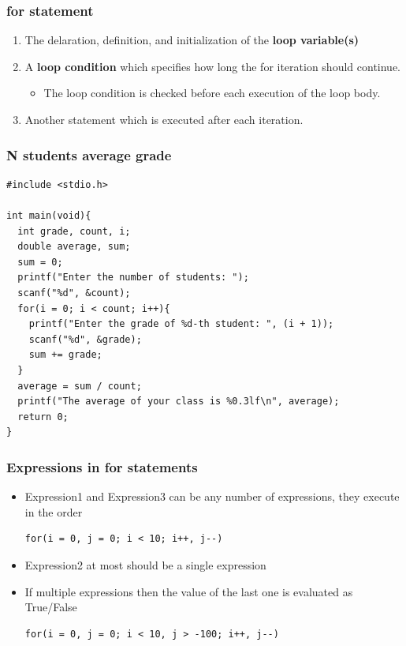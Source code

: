 \documentclass{../c-lecture}
\begin{document}
\begin{frame}
  \frametitle{for statement}
  \begin{enumerate}
    \item The delaration, definition, and initialization of the \textbf{loop variable(s)}
    \item A \textbf{loop condition} which specifies how long the for iteration should continue.
    \begin{itemize}
      \item The loop condition is checked before each execution of the loop body.
    \end{itemize}
    \item Another statement which is executed after each iteration.
  \end{enumerate}
\end{frame}

\begin{frame}[fragile]
  \frametitle{N students average grade}
  \scriptsize
  \begin{verbatim}
#include <stdio.h>

int main(void){
  int grade, count, i;
  double average, sum;
  sum = 0;
  printf("Enter the number of students: ");
  scanf("%d", &count);
  for(i = 0; i < count; i++){
    printf("Enter the grade of %d-th student: ", (i + 1));
    scanf("%d", &grade);
    sum += grade;
  }
  average = sum / count;
  printf("The average of your class is %0.3lf\n", average);
  return 0;
}
  \end{verbatim}
\end{frame}

\begin{frame}[fragile]
  \frametitle{Expressions in for statements}
  \begin{itemize}
    \item
      Expression1 and Expression3 can be any number of expressions, they execute
      in the order
    \begin{verbatim}
for(i = 0, j = 0; i < 10; i++, j--)
    \end{verbatim}
    \item Expression2 at most should be a single expression
    \item
      If multiple expressions then the value of the last one is evaluated as
      True/False
    \begin{verbatim}
for(i = 0, j = 0; i < 10, j > -100; i++, j--)
    \end{verbatim}
  \end{itemize}
\end{frame}
\end{document}
